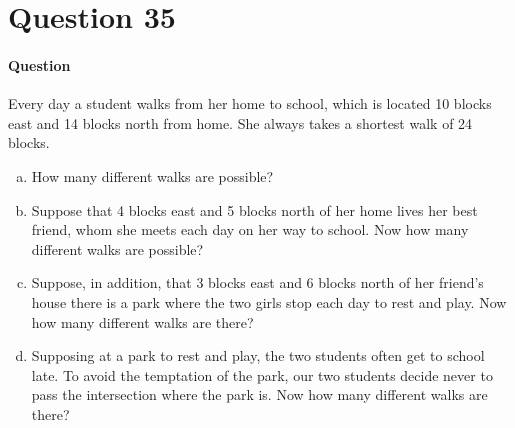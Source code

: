 \documentclass{article}
\begin{document}
\section{Question 35}
\paragraph{Question}
Every day a student walks from her home to school, which is located 10 blocks east and 14 blocks north from home. She always takes a shortest walk of 24 blocks.
\begin{enumerate}[(a)]
    \item How many different walks are possible?
    \item Suppose that 4 blocks east and 5 blocks north of her home lives her best
    friend, whom she meets each day on her way to school. Now how many
    different walks are possible?
    \item Suppose, in addition, that 3 blocks east and 6 blocks north of her friend’s
    house there is a park where the two girls stop each day to rest and play. Now
    how many different walks are there?
    \item Supposing at a park to rest and play, the two students often get to school late.
    To avoid the temptation of the park, our two students decide never to pass
    the intersection where the park is. Now how many different walks are there?
\end{enumerate}
\end{document}
